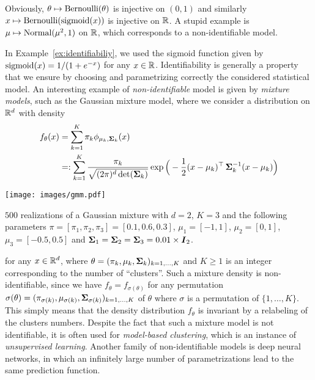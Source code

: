 \begin{example}
	\label{ex:identifiabiliy}
	Obviously, $\theta \mapsto \operatorname{Bernoulli}(\theta)$ is injective on $(0, 1)$ and similarly $x \mapsto \operatorname{Bernoulli}(\operatorname{sigmoid}(x))$ is injective on $\mathbb R$.
	A stupid example is $\mu \mapsto \operatorname{Normal}(\mu^2, 1)$ on $\mathbb R$, which corresponds to a non-identifiable model.
\end{example}
In Example~\ref{ex:identifiabiliy}, we used the sigmoid function given by $\operatorname{sigmoid}(x) = 1 / (1 + e^{-x})$ for any $x \in \mathbb R$.%
Identifiability is generally a property that we ensure by choosing and parametrizing correctly the considered statistical model.
An interesting example of \emph{non-identifiable} model is given by \emph{mixture models}, such as the Gaussian mixture model, where we consider a distribution on $\mathbb R^d$ with density
%
\begin{align*}
	f_\theta(x) &= \sum_{k=1}^K \pi_k \phi_{\mu_k, \operatorname{\boldsymbol \Sigma}_k}(x) \\ 
	&=: \sum_{k=1}^K \frac{\pi_k }{\sqrt{(2 \pi)^d \det (\operatorname{\boldsymbol \Sigma}_k)}} 
	\exp\Big( -\frac 12 (x - \mu_k)^\top \operatorname{\boldsymbol \Sigma}_k^{-1} (x - \mu_k) \Big)
\end{align*}
\begin{marginfigure}
	\texttt{[image: images/gmm.pdf]}
	\caption{$500$ realizations of a Gaussian mixture with $d=2$, $K=3$ and the following parameters $\pi = [\pi_1, \pi_2, \pi_3] = [0.1, 0.6, 0.3]$, $\mu_1 = [-1, 1]$, $\mu_2 = [0, 1]$, $\mu_3 = [-0.5, 0.5]$ and $\operatorname{\boldsymbol \Sigma}_1 = \operatorname{\boldsymbol \Sigma}_2 = \operatorname{\boldsymbol \Sigma}_3 = 0.01 \times \operatorname{\boldsymbol I}_2$.}
\end{marginfigure}
for any $x \in \mathbb R^d$, where $\theta = (\pi_k, \mu_k, \operatorname{\boldsymbol \Sigma}_k)_{k=1, \ldots, K}$ and $K \geq 1$ is an integer corresponding to the number of ``clusters''.
Such a mixture density is non-identifiable, since we have $f_{\theta} = f_{\sigma(\theta)}$
for any permutation $\sigma(\theta) = (\pi_{\sigma(k)}, \mu_{\sigma(k)}, \operatorname{\boldsymbol \Sigma}_{\sigma(k)})_{k=1, \ldots, K}$ of $\theta$ where $\sigma$ is a permutation of $\{1, \ldots, K \}$.
This simply means that the density distribution $f_\theta$ is invariant by a relabeling of the clusters numbers.
Despite the fact that such a mixture model is not identifiable, it is often used for \emph{model-based clustering}, which is an instance of \emph{unsupervised learning}.
Another family of non-identifiable models is deep neural networks, in which an infinitely large number of parametrizations lead to the same prediction function.

